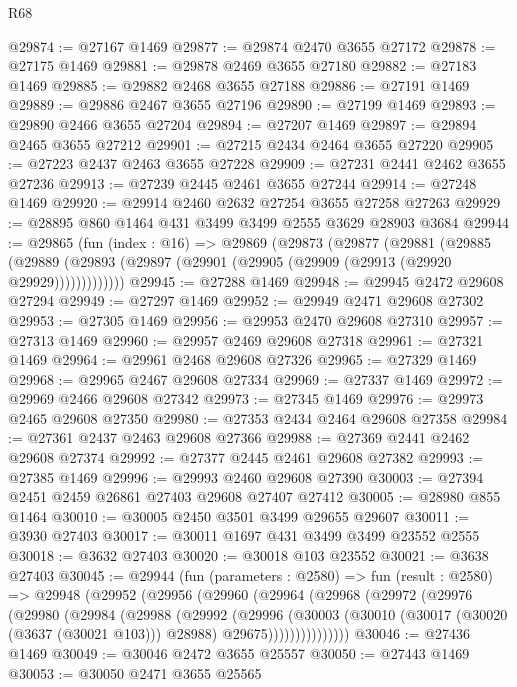 \begin{lexlean}{R68}
\begin{coremodule}
@29874 := @27167 @1469
@29877 := @29874 @2470 @3655 @27172
@29878 := @27175 @1469
@29881 := @29878 @2469 @3655 @27180
@29882 := @27183 @1469
@29885 := @29882 @2468 @3655 @27188
@29886 := @27191 @1469
@29889 := @29886 @2467 @3655 @27196
@29890 := @27199 @1469
@29893 := @29890 @2466 @3655 @27204
@29894 := @27207 @1469
@29897 := @29894 @2465 @3655 @27212
@29901 := @27215 @2434 @2464 @3655 @27220
@29905 := @27223 @2437 @2463 @3655 @27228
@29909 := @27231 @2441 @2462 @3655 @27236
@29913 := @27239 @2445 @2461 @3655 @27244
@29914 := @27248 @1469
@29920 := @29914 @2460 @2632 @27254 @3655 @27258 @27263
@29929 := @28895 @860 @1464 @431 @3499 @3499 @2555 @3629 @28903 @3684
@29944 := @29865
    (fun (index : @16) =>
    @29869
      (@29873
        (@29877
          (@29881
            (@29885
              (@29889 (@29893 (@29897 (@29901 (@29905 (@29909 (@29913 (@29920 @29929)))))))))))))
@29945 := @27288 @1469
@29948 := @29945 @2472 @29608 @27294
@29949 := @27297 @1469
@29952 := @29949 @2471 @29608 @27302
@29953 := @27305 @1469
@29956 := @29953 @2470 @29608 @27310
@29957 := @27313 @1469
@29960 := @29957 @2469 @29608 @27318
@29961 := @27321 @1469
@29964 := @29961 @2468 @29608 @27326
@29965 := @27329 @1469
@29968 := @29965 @2467 @29608 @27334
@29969 := @27337 @1469
@29972 := @29969 @2466 @29608 @27342
@29973 := @27345 @1469
@29976 := @29973 @2465 @29608 @27350
@29980 := @27353 @2434 @2464 @29608 @27358
@29984 := @27361 @2437 @2463 @29608 @27366
@29988 := @27369 @2441 @2462 @29608 @27374
@29992 := @27377 @2445 @2461 @29608 @27382
@29993 := @27385 @1469
@29996 := @29993 @2460 @29608 @27390
@30003 := @27394 @2451 @2459 @26861 @27403 @29608 @27407 @27412
@30005 := @28980 @855 @1464
@30010 := @30005 @2450 @3501 @3499 @29655 @29607
@30011 := @3930 @27403
@30017 := @30011 @1697 @431 @3499 @3499 @23552 @2555
@30018 := @3632 @27403
@30020 := @30018 @103 @23552
@30021 := @3638 @27403
@30045 := @29944
    (fun (parameters : @2580) =>
    fun (result : @2580) =>
    @29948
      (@29952
        (@29956
          (@29960
            (@29964
              (@29968
                (@29972
                  (@29976
                    (@29980
                      (@29984
                        (@29988
                          (@29992
                            (@29996
                              (@30003
                                (@30010
                                  (@30017 (@30020 (@3637 (@30021 @103))) @28988)
                                  @29675)))))))))))))))
@30046 := @27436 @1469
@30049 := @30046 @2472 @3655 @25557
@30050 := @27443 @1469
@30053 := @30050 @2471 @3655 @25565

\end{coremodule}
\end{lexlean}

